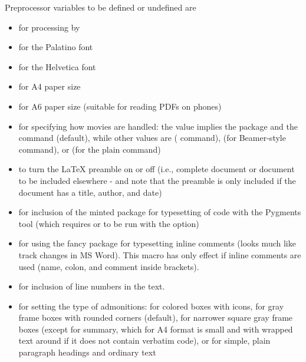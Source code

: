 \documentclass[%
oneside,                 %
final,                   %
10pt]{article}
\begin{document}
Preprocessor variables to be defined or undefined are

\begin{itemize}
 \item {} for processing by 

 \item {} for the Palatino font

 \item {} for the Helvetica font

 \item {} for A4 paper size

 \item {} for A6 paper size (suitable for reading PDFs on phones)

 \item {} for specifying how movies are handled: the value 
   implies the  package and the  command (default),
   while other values are  ( command),
    (for Beamer-style \code{\movie} command),
   or  (for the plain  command)

 \item {} to turn the {\LaTeX} preamble on or off (i.e., complete document
   or document to be included elsewhere - and note that
   the preamble is only included
   if the document has a title, author, and date)

 \item {} for inclusion of the minted package for typesetting of
   code with the Pygments tool (which requires 
   or  to be run with the  option)

 \item {} for using the fancy  package for typesetting
   inline comments (looks much like track changes in MS Word). This
   macro has only effect if inline comments are used (name, colon,
   and comment inside brackets).

 \item {} for inclusion of line numbers in the text.

 \item {} for setting the type of admonitions:  for colored
   boxes with icons,  for gray frame boxes with rounded
   corners (default),  for narrower square gray frame boxes
   (except for summary, which for A4 format is small and with wrapped
   text around if it does not contain verbatim code),
   or  for simple, plain paragraph headings and ordinary text


\end{itemize}
\end{document}
